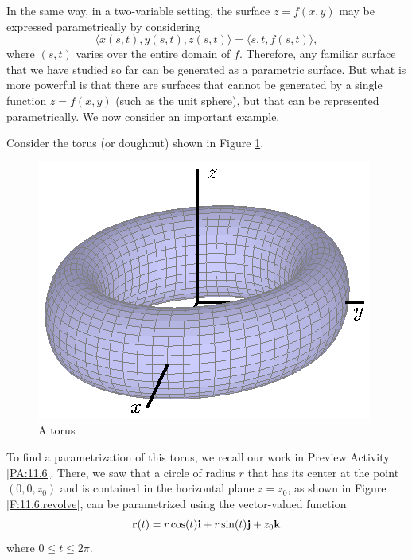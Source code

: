 In the same way, in a two-variable setting, the surface $z = f(x,y)$ may be expressed parametrically by considering 
$$\langle x(s,t), y(s,t), z(s,t) \rangle = \langle s, t, f(s,t) \rangle,$$
where $(s,t)$ varies over the entire domain of $f$.  Therefore, any familiar surface that we have studied so far can be generated as a parametric surface.  But what is more powerful is that there are surfaces that cannot be generated by a single function $z = f(x,y)$ (such as the unit sphere), but that can be represented parametrically.  We now consider an important example.


%


\begin{example} \label{ex:11.6.Torus} Consider the 
  torus (or doughnut) shown in Figure \ref{F:11.6.torus}.

  \begin{figure}[ht]
    \begin{center}
      \includegraphics{figures/fig_11_6_torus.eps}
    \end{center}
    \caption{A torus}
    \label{F:11.6.torus}
  \end{figure}

To find a parametrization of this torus, we recall our work in Preview
Activity \ref{PA:11.6}.  There, we saw that a circle of radius $r$
that has its center at the point $(0,0,z_0)$ and is contained in the
horizontal plane $z = z_0$, as shown in Figure \ref{F:11.6.revolve}, can be
parametrized using the vector-valued function
$$
\mathbf{r}(t) = r\cos(t)\mathbf{i} + r\sin(t)\mathbf{j} + z_0\mathbf{k}
$$
where $0\leq t\leq 2\pi$.


\end{example}

